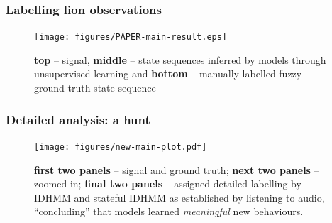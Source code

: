 \documentclass[aspectratio=169]{beamer}
\begin{document}
\begin{frame}
    \frametitle{Labelling lion observations}
    \begin{figure}[ht!]
        \texttt{[image: figures/PAPER-main-result.eps]}
        \vspace{-0.5em}
        \caption{{\bf top} --  signal, {\bf middle} -- state sequences inferred by models through unsupervised learning and {\bf bottom} -- manually labelled fuzzy ground truth state sequence}
    \end{figure}
\end{frame}


\begin{frame}
    \frametitle{Detailed analysis: a hunt}
    \begin{figure}
        \texttt{[image: figures/new-main-plot.pdf]}
        \caption{{\bf first two panels} -- signal and ground truth; {\bf next two panels} -- zoomed in; {\bf final two panels} --  assigned detailed labelling by IDHMM and stateful IDHMM as established by listening to audio, ``concluding'' that models learned \emph{meaningful} new behaviours.}
    \end{figure}
\end{frame}
\end{document}
